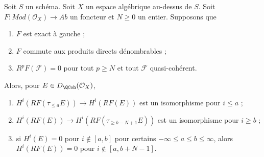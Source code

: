 \begin{lemma}
\label{lemma-application-nice-K-injective}
Soit $S$ un schéma. Soit $X$ un espace algébrique au-dessus de $S$.
Soit $F : \textit{Mod}(\mathcal{O}_X) \to \textit{Ab}$
un foncteur et $N \geq 0$ un entier. Supposons que
\begin{enumerate}
\item $F$ est exact à gauche ;
\item $F$ commute aux produits directs dénombrables ;
\item $R^pF(\mathcal{F}) = 0$ pour tout $p \geq N$ et tout $\mathcal{F}$
quasi-cohérent.
\end{enumerate}
Alors, pour $E \in D_\QCoh(\mathcal{O}_X)$,
\begin{enumerate}
\item $H^i(RF(\tau_{\leq a}E)) \to H^i(RF(E))$ est un isomorphisme
pour $i \leq a$ ;
\item $H^i(RF(E)) \to H^i(RF(\tau_{\geq b - N + 1}E))$ est un isomorphisme
pour $i \geq b$ ;
\item si $H^i(E) = 0$ pour $i \not \in [a, b]$ pour certains
$-\infty \leq a \leq b \leq \infty$, alors $H^i(RF(E)) = 0$
pour $i \not \in [a, b + N - 1]$.
\end{enumerate}
\end{lemma}

